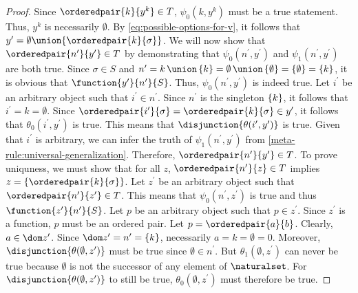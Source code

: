 \begin{proof}
    \vspace{0.1cm}
    \noindent
    Since \( \orderedpair{k}{y^{k}} \in T \), \( \psi_{0}(k, y^{k}) \) must be a true statement.
    Thus, \( y^{k} \) is necessarily \( \emptyset \).
    By \eqref{eq:possible-options-for-v}, it follows that \( y^{\prime} = \emptyset \union \mleft\{ \orderedpair{k}{\sigma} \mright\} \).
    We will now show that \( \orderedpair{n^{\prime}}{y^{\prime}} \in T \) by demonstrating that \( \psi_{0}(n^{\prime}, y^{\prime}) \)
    and \( \psi_{1}(n^{\prime}, y^{\prime}) \) are both true.
    Since \( \sigma \in S \) and
    \( n^{\prime} = k \,{\union}\, \mleft\{ k \mright\} = \emptyset \,{\union}\, \mleft\{ \emptyset \mright\} = \mleft\{ \emptyset \mright\} = \mleft\{ k \mright\} \),
    it is obvious that \( \function{y^{\prime}}{n^{\prime}}{S} \).
    Thus, \( \psi_{0}(n^{\prime}, y^{\prime}) \) is indeed true.
    Let \( i^{\prime} \) be an arbitrary object such that \( i^{\prime} \in n^{\prime} \).
    Since \( n^{\prime} \) is the singleton \( \mleft\{ k \mright\} \), it follows that \( i^{\prime} = k = \emptyset \).
    Since \( \orderedpair{i^{\prime}}{\sigma} = \orderedpair{k}{\sigma} \in y^{\prime} \), it follows that \( \theta_{0}(i^{\prime}, y^{\prime}) \) is true.
    This means that \( \disjunction{\theta(i^{\prime}, y^{\prime})} \) is true.
    Given that \( i^{\prime} \) is arbitrary, we can infer the truth of \( \psi_{1}(n^{\prime}, y^{\prime}) \) from \cref{meta-rule:universal-generalization}.
    Therefore, \( \orderedpair{n^{\prime}}{y^{\prime}} \in T \).
    To prove uniquness, we must show that for all \( z \), \( \orderedpair{n^{\prime}}{z} \in T \) implies \( z = \mleft\{ \orderedpair{k}{\sigma} \mright\} \).
    Let \( z^{\prime} \) be an arbitrary object such that \( \orderedpair{n^{\prime}}{z^{\prime}} \in T \).
    This means that \( \psi_{0}(n^{\prime}, z^{\prime}) \) is true and thus \( \function{z^{\prime}}{n^{\prime}}{S} \).
    Let \( p \) be an arbitrary object such that \( p \in z^{\prime} \).
    Since \( z^{\prime} \) is a function, \( p \) must be an ordered pair.
    Let \( p = \orderedpair{a}{b} \).
    Clearly, \( a \in \dom z^{\prime} \).
    Since \( \dom z^{\prime} = n^{\prime} = \mleft\{ k \mright\} \), necessarily \( a = k = \emptyset = 0 \).
    Moreover, \( \disjunction{\theta(\emptyset, z^{\prime})} \) must be true since \( \emptyset \in n^{\prime} \).
    But \( \theta_{1}(\emptyset, z^{\prime}) \) can never be true because \( \emptyset \) is not the successor of any element of \( \naturalset \).
    For \( \disjunction{\theta(\emptyset, z^{\prime})} \) to still be true, \( \theta_{0}(\emptyset, z^{\prime}) \) must therefore be true.

\end{proof}
